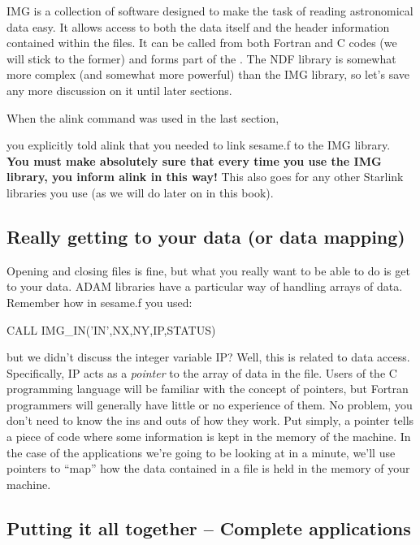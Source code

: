 \documentclass[11pt,nolof]{starlink}
\begin{document}
IMG is a collection of software designed to make the task of reading
astronomical data easy. It allows access to both the data itself and the
header information contained within the files. It can be called from both
Fortran and C codes (we will stick to the former) and forms part
of the . The NDF library is somewhat more
complex (and somewhat more powerful) than the IMG library, so let's save
any more discussion on it until later sections.

When the \textsf{alink} command was used in the last section,

\begin{terminalv}
\end{terminalv}

you explicitly told alink that you needed to link \textsf{sesame.f} to
the IMG library. \textbf{You must make absolutely sure that every
time you use the IMG library, you inform alink in this way!} This
also goes for any other Starlink libraries you use (as we will do later
on in this book).

\subsection{Really getting to your data (or data mapping)}

Opening and closing files is fine, but what you really want to be able to
do is get to your data. ADAM libraries have a particular way of handling
arrays of data. Remember how in \textsf{sesame.f} you used:

\begin{terminalv}
CALL IMG_IN('IN',NX,NY,IP,STATUS)
\end{terminalv}

but we didn't discuss the integer variable \textsf{IP}? Well, this is
related to data access. Specifically, \textsf{IP} acts as a \textit{pointer} to the array of data in the file. Users of the C programming
language will be familiar with the concept of pointers, but Fortran
programmers will generally have little or no experience of them. No problem,
you don't need to know the ins and outs of how they work. Put simply, a
pointer tells a piece of code where some information is kept in the memory
of the machine. In the case of the applications we're going to be looking
at in a minute, we'll use pointers to ``map'' how the data contained in a
file is held in the memory of your machine.

\subsection{Putting it all together -- Complete applications}
\end{document}
